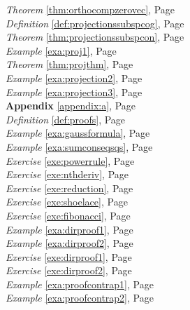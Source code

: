 \begin{multicols}{3}
\begin{center}
      \textit{Theorem} \ref{thm:orthocompzerovec}, Page \pageref{thm:orthocompzerovec} \\
      \textit{Definition} \ref{def:projectionssubspcog}, Page \pageref{def:projectionssubspcog} \\
      \textit{Theorem} \ref{thm:projectionssubspcon}, Page \pageref{thm:projectionssubspcon} \\
      \textit{Example} \ref{exa:proj1}, Page \pageref{exa:proj1} \\
      \textit{Theorem} \ref{thm:projthm}, Page \pageref{thm:projthm} \\
      \textit{Example} \ref{exa:projection2}, Page \pageref{exa:projection2} \\
      \textit{Example} \ref{exa:projection3}, Page \pageref{exa:projection3} \\
      \textbf{Appendix} \ref{appendix:a}, Page \pageref{appendix:a} \\
      \textit{Definition} \ref{def:proofs}, Page \pageref{def:proofs} \\
      \textit{Example} \ref{exa:gaussformula}, Page \pageref{exa:gaussformula} \\
      \textit{Example} \ref{exa:sumconseqsqs}, Page \pageref{exa:sumconseqsqs} \\
      \textit{Exercise} \ref{exe:powerrule}, Page \pageref{exe:powerrule} \\
      \textit{Exercise} \ref{exe:nthderiv}, Page \pageref{exe:nthderiv} \\
      \textit{Exercise} \ref{exe:reduction}, Page \pageref{exe:reduction} \\
      \textit{Exercise} \ref{exe:shoelace}, Page \pageref{exe:shoelace} \\
      \textit{Exercise} \ref{exe:fibonacci}, Page \pageref{exe:fibonacci} \\
      \textit{Example} \ref{exa:dirproof1}, Page \pageref{exa:dirproof1} \\
      \textit{Example} \ref{exa:dirproof2}, Page \pageref{exa:dirproof2} \\
      \textit{Exercise} \ref{exe:dirproof1}, Page \pageref{exe:dirproof1} \\
      \textit{Exercise} \ref{exe:dirproof2}, Page \pageref{exe:dirproof2} \\
      \textit{Example} \ref{exa:proofcontrap1}, Page \pageref{exa:proofcontrap1} \\
      \textit{Example} \ref{exa:proofcontrap2}, Page \pageref{exa:proofcontrap2} \\

\end{center}
\end{multicols}
